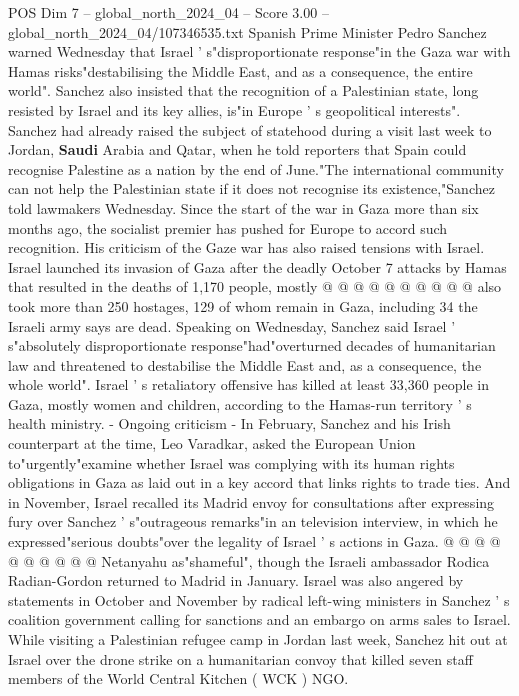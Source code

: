 \begin{textsample}{POS Dim 7 – global\_north\_2024\_04 – Score 3.00 – global\_north\_2024\_04/107346535.txt}  \label{ex:f7_pos_225}
Spanish Prime Minister Pedro Sanchez warned Wednesday that Israel ' s"disproportionate response"in the Gaza war with Hamas risks"destabilising the Middle East, and as a consequence, the entire world".
Sanchez also insisted that the recognition of a Palestinian state, long resisted by Israel and its key allies, is"in Europe ' s geopolitical interests".
Sanchez had already raised the subject of statehood during a visit last week to Jordan, \textbf{Saudi} Arabia and Qatar, when he told reporters that Spain could recognise Palestine as a nation by the end of June."The international community can not help the Palestinian state if it does not recognise its existence,"Sanchez told lawmakers Wednesday.
Since the start of the war in Gaza more than six months ago, the socialist premier has pushed for Europe to accord such recognition.
His criticism of the Gaze war has also raised tensions with Israel.
Israel launched its invasion of Gaza after the deadly October 7 attacks by Hamas that resulted in the deaths of 1,170 people, mostly @ @ @ @ @ @ @ @ @ @ also took more than 250 hostages, 129 of whom remain in Gaza, including 34 the Israeli army says are dead.
Speaking on Wednesday, Sanchez said Israel ' s"absolutely disproportionate response"had"overturned decades of humanitarian law and threatened to destabilise the Middle East and, as a consequence, the whole world".
Israel ' s retaliatory offensive has killed at least 33,360 people in Gaza, mostly women and children, according to the Hamas-run territory ' s health ministry. - Ongoing criticism - In February, Sanchez and his Irish counterpart at the time, Leo Varadkar, asked the European Union to"urgently"examine whether Israel was complying with its human rights obligations in Gaza as laid out in a key accord that links rights to trade ties.
And in November, Israel recalled its Madrid envoy for consultations after expressing fury over Sanchez ' s"outrageous remarks"in an television interview, in which he expressed"serious doubts"over the legality of Israel ' s actions in Gaza. @ @ @ @ @ @ @ @ @ @ Netanyahu as"shameful", though the Israeli ambassador Rodica Radian-Gordon returned to Madrid in January.
Israel was also angered by statements in October and November by radical left-wing ministers in Sanchez ' s coalition government calling for sanctions and an embargo on arms sales to Israel.
While visiting a Palestinian refugee camp in Jordan last week, Sanchez hit out at Israel over the drone strike on a humanitarian convoy that killed seven staff members of the World Central Kitchen ( WCK ) NGO.

\end{textsample}
